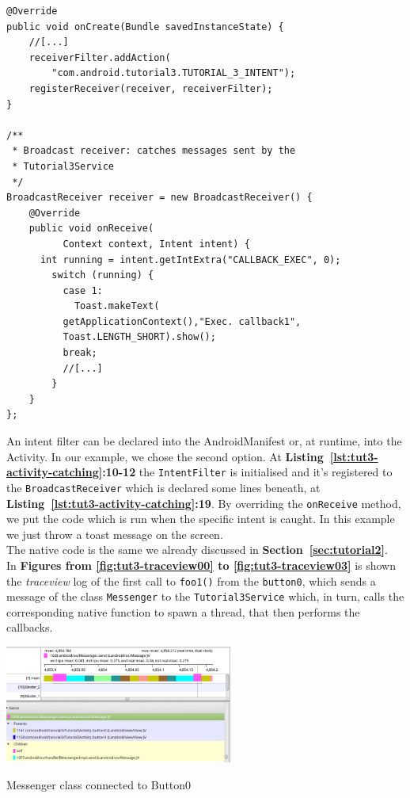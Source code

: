 \documentclass[a4paper,10pt]{article}
\makeatletter
\newenvironment{figurehere}{\def\@captype{figure}\vspace{2ex}}{\vspace{2ex}}
\newcommand{\keyword}[1]{\texttt{#1}}
\newcommand{\refl}[1]{\textbf{Listing~\ref{#1}}}
\newcommand{\refs}[1]{\textbf{Section~\ref{#1}}}
\makeatother
\begin{document}
\begin{multicols}{2}
\begin{lstlisting}
@Override
public void onCreate(Bundle savedInstanceState) {
	//[...]
	receiverFilter.addAction(
		"com.android.tutorial3.TUTORIAL_3_INTENT");
	registerReceiver(receiver, receiverFilter);
}

/**
 * Broadcast receiver: catches messages sent by the
 * Tutorial3Service
 */
BroadcastReceiver receiver = new BroadcastReceiver() {
	@Override
	public void onReceive(
          Context context, Intent intent) {
	  int running = intent.getIntExtra("CALLBACK_EXEC", 0);
	    switch (running) {
	      case 1:
	        Toast.makeText(
		  getApplicationContext(),"Exec. callback1",
		  Toast.LENGTH_SHORT).show();
	      break;
	      //[...]
	    }
	}
};
\end{lstlisting}
An intent filter can be declared into the AndroidManifest or, at runtime, into
the Activity. In our example, we chose the second option. At
\refl{lst:tut3-activity-catching}\textbf{:10-12} the \keyword{IntentFilter} is
initialised and it's registered to the \keyword{BroadcastReceiver} which is
declared some lines beneath, at \refl{lst:tut3-activity-catching}\textbf{:19}.
By overriding the \keyword{onReceive} method, we put the code which is run when
the specific intent is caught. In this example we just throw a toast message on
the screen.\\
The native code is the same we already discussed in \refs{sec:tutorial2}.\\
In \textbf{Figures from \ref{fig:tut3-traceview00} to
\ref{fig:tut3-traceview03}} is shown the \textit{traceview} log of the first
call to \keyword{foo1()} from the \keyword{button0}, which sends a message of
the class \keyword{Messenger} to the \keyword{Tutorial3Service} which, in turn,
calls the corresponding native function to spawn a thread, that then performs
the callbacks.

\begin{figurehere}
 \centering
 \includegraphics[width=7.5cm]{./figures/traceview00.png}
 \caption{Messenger class connected to Button0}
 \label{fig:tut3-traceview00}
\end{figurehere}


\end{multicols}
\end{document}

